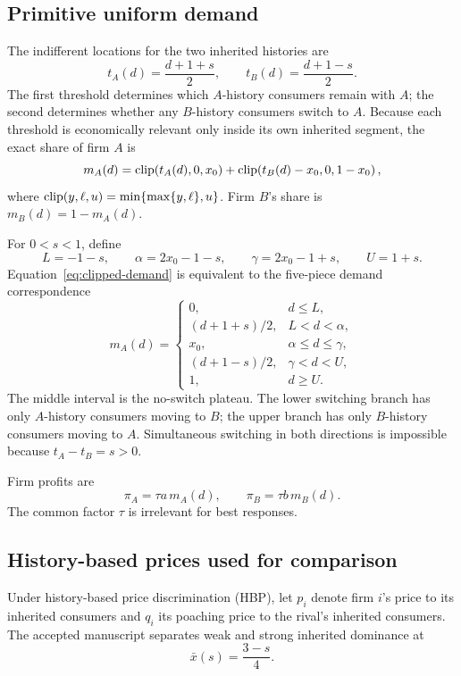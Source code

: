 \subsection{Primitive uniform demand}

The indifferent locations for the two inherited histories are
\[
t_A(d)=\frac{d+1+s}{2},
\qquad
t_B(d)=\frac{d+1-s}{2}.
\]
The first threshold determines which \(A\)-history consumers remain with \(A\); the second determines whether any \(B\)-history consumers switch to \(A\). Because each threshold is economically relevant only inside its own inherited segment, the exact share of firm \(A\) is
\begin{equation}
m_A(d)
=
\operatorname{clip}\!\left(t_A(d),0,x_0\right)
+
\operatorname{clip}\!\left(t_B(d)-x_0,0,1-x_0\right),
\label{eq:clipped-demand}
\end{equation}
where \(\operatorname{clip}(y,\ell,u)=\min\{\max\{y,\ell\},u\}\). Firm \(B\)'s share is \(m_B(d)=1-m_A(d)\).

For \(0<s<1\), define
\[
L=-1-s,\qquad
\alpha=2x_0-1-s,\qquad
\gamma=2x_0-1+s,\qquad
U=1+s.
\]
Equation~\eqref{eq:clipped-demand} is equivalent to the five-piece demand correspondence
\begin{equation}
m_A(d)=
\begin{cases}
0,&d\le L,\\[0.25em]
(d+1+s)/2,&L<d<\alpha,\\[0.25em]
x_0,&\alpha\le d\le\gamma,\\[0.25em]
(d+1-s)/2,&\gamma<d<U,\\[0.25em]
1,&d\ge U.
\end{cases}
\label{eq:five-piece-demand}
\end{equation}
The middle interval is the no-switch plateau. The lower switching branch has only \(A\)-history consumers moving to \(B\); the upper branch has only \(B\)-history consumers moving to \(A\). Simultaneous switching in both directions is impossible because \(t_A-t_B=s>0\).

Firm profits are
\[
\pi_A=\tau a\,m_A(d),\qquad
\pi_B=\tau b\,m_B(d).
\]
The common factor \(\tau\) is irrelevant for best responses.

\subsection{History-based prices used for comparison}

Under history-based price discrimination (HBP), let \(p_i\) denote firm \(i\)'s price to its inherited consumers and \(q_i\) its poaching price to the rival's inherited consumers. The accepted manuscript separates weak and strong inherited dominance at
\[
\bar x(s)=\frac{3-s}{4}.
\]

